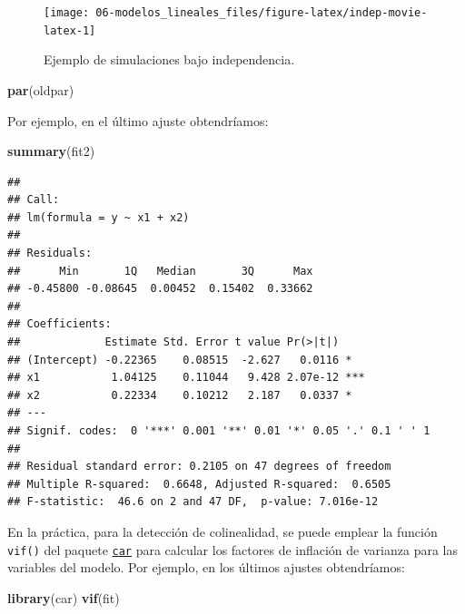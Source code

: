 \documentclass[
  spanish,
]{book}
\newenvironment{Shaded}{\begin{snugshade}}{\end{snugshade}}
\newcommand{\KeywordTok}[1]{\textcolor[rgb]{0.13,0.29,0.53}{\textbf{#1}}}
\newcommand{\NormalTok}[1]{#1}
\theoremstyle{break}
\theoremstyle{definition}
\theoremstyle{definition}
\theoremstyle{definition}
\theoremstyle{remark}
\begin{document}
\begin{figure}[!htb]

{\centering \texttt{[image: 06-modelos\_lineales\_files/figure-latex/indep-movie-latex-1]} 

}

\caption{Ejemplo de simulaciones bajo independencia.}\label{fig:indep-movie-latex}
\end{figure}

\begin{Shaded}
\begin{Highlighting}[]
\KeywordTok{par}\NormalTok{(oldpar)}
\end{Highlighting}
\end{Shaded}

Por ejemplo, en el último ajuste obtendríamos:

\begin{Shaded}
\begin{Highlighting}[]
\KeywordTok{summary}\NormalTok{(fit2)}
\end{Highlighting}
\end{Shaded}

\begin{verbatim}
## 
## Call:
## lm(formula = y ~ x1 + x2)
## 
## Residuals:
##      Min       1Q   Median       3Q      Max 
## -0.45800 -0.08645  0.00452  0.15402  0.33662 
## 
## Coefficients:
##             Estimate Std. Error t value Pr(>|t|)    
## (Intercept) -0.22365    0.08515  -2.627   0.0116 *  
## x1           1.04125    0.11044   9.428 2.07e-12 ***
## x2           0.22334    0.10212   2.187   0.0337 *  
## ---
## Signif. codes:  0 '***' 0.001 '**' 0.01 '*' 0.05 '.' 0.1 ' ' 1
## 
## Residual standard error: 0.2105 on 47 degrees of freedom
## Multiple R-squared:  0.6648, Adjusted R-squared:  0.6505 
## F-statistic:  46.6 on 2 and 47 DF,  p-value: 7.016e-12
\end{verbatim}

En la práctica, para la detección de colinealidad, se puede emplear la función
\texttt{vif()} del paquete \href{https://CRAN.R-project.org/package=car}{\texttt{car}} para calcular los factores de inflación de varianza para las variables del modelo.
Por ejemplo, en los últimos ajustes obtendríamos:

\begin{Shaded}
\begin{Highlighting}[]
\KeywordTok{library}\NormalTok{(car)}
\KeywordTok{vif}\NormalTok{(fit)}
\end{Highlighting}
\end{Shaded}
\end{document}

